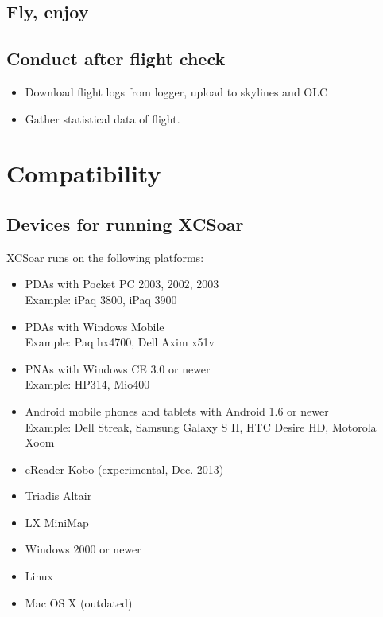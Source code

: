 \subsection*{Fly, enjoy}
\vspace{4em}

\subsection*{Conduct after flight check}
\begin{itemize}
\item Download flight logs from logger, upload to skylines and OLC
\item Gather statistical data of flight.
\end{itemize}
\newpage




\section{Compatibility}

\subsection*{Devices for running XCSoar}

XCSoar runs on the following platforms:

\begin{itemize}
\item PDAs with Pocket PC 2003, 2002, 2003 \\
  Example: iPaq 3800, iPaq 3900
\item PDAs with Windows Mobile \\
  Example: Paq hx4700, Dell Axim x51v
\item PNAs with Windows CE 3.0 or newer \\
  Example: HP314, Mio400
\item Android mobile phones and tablets with Android 1.6 or newer \\
  Example: Dell Streak, Samsung Galaxy S II, HTC Desire HD,
  Motorola Xoom
\item eReader Kobo (experimental, Dec. 2013)
\item Triadis Altair
\item LX MiniMap
\item Windows 2000 or newer
\item Linux
\item Mac OS X (outdated)
\end{itemize}

